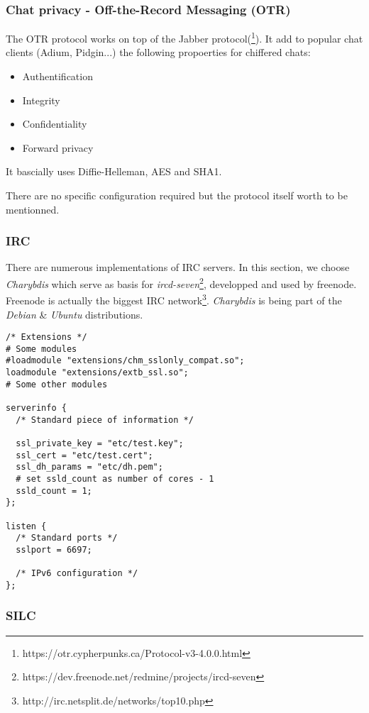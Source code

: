 \subsubsection{Chat privacy - Off-the-Record Messaging (OTR)}

The OTR protocol works on top of the Jabber protocol(\footnote{https://otr.cypherpunks.ca/Protocol-v3-4.0.0.html}).  
It add to popular chat clients (Adium, Pidgin...) the following propoerties for chiffered chats:
\begin{itemize}
    \item Authentification
    \item Integrity
    \item Confidentiality
    \item Forward privacy
\end{itemize}

It bascially uses Diffie-Helleman, AES and SHA1. 

There are no specific configuration required but the protocol itself worth to be mentionned.

\subsubsection{IRC}


There are numerous implementations of IRC servers.  In this section, we choose {\it Charybdis} which serve as basis for {\it ircd-seven}\footnote{https://dev.freenode.net/redmine/projects/ircd-seven}, developped and used by freenode. Freenode is actually the biggest IRC network\footnote{http://irc.netsplit.de/networks/top10.php}.  {\it Charybdis} is being part of the {\it Debian} \& {\it Ubuntu} distributions.

\begin{lstlisting}[breaklines]
/* Extensions */
# Some modules 
#loadmodule "extensions/chm_sslonly_compat.so";
loadmodule "extensions/extb_ssl.so";
# Some other modules

serverinfo {
  /* Standard piece of information */
  
  ssl_private_key = "etc/test.key";
  ssl_cert = "etc/test.cert";
  ssl_dh_params = "etc/dh.pem";
  # set ssld_count as number of cores - 1
  ssld_count = 1; 
};

listen {
  /* Standard ports */
  sslport = 6697;

  /* IPv6 configuration */
};
\end{lstlisting}


\subsubsection{SILC}



